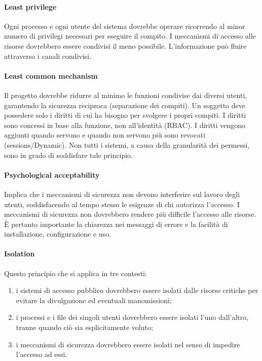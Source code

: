\paragraph{Least privilege}
Ogni processo e ogni utente del sistema dovrebbe operare ricorrendo al
minor numero di privilegi necessari per eseguire il compito.
I meccanismi di accesso alle risorse dovrebbero essere condivisi il meno possibile.
L'informazione può fluire attraverso i canali condivisi.

\paragraph{Least common mechanism}
Il progetto dovrebbe ridurre al minimo le funzioni condivise dai
diversi utenti, garantendo la sicurezza reciproca (separazione dei compiti).
Un soggetto deve possedere solo i diritti di cui ha bisogno per svolgere i propri
compiti. I diritti sono concessi in base alla funzione, non all'identità (RBAC).
I diritti vengono aggiunti quando servono e quando non servono più sono revocati
(sessions/Dynamic).
Non tutti i sistemi, a causa della granularità dei permessi, sono in grado di
soddisfare tale principio.

\paragraph{Psychological acceptability}
Implica che i meccanismi di sicurezza non devono interferire
sul lavoro degli utenti, soddisfacendo al tempo stesso le esigenze di chi
autorizza l'accesso.
I meccanismi di sicurezza non dovrebbero rendere più difficile l'accesso alle
risorse. È pertanto importante la chiarezza nei messaggi di errore e la
facilità di installazione, configurazione e uso.

\paragraph{Isolation}
Questo principio che si applica in tre contesti:
\begin{enumerate}
    \item i sistemi di accesso pubblico dovrebbero essere isolati dalle
          risorse critiche per evitare la
          divulgazione ed eventuali manomissioni;
    \item i processi e i file dei singoli utenti dovrebbero essere isolati
          l'uno dall'altro, tranne quando
          ciò sia esplicitamente voluto;
    \item i meccanismi di sicurezza dovrebbero essere isolati nel senso di
          impedire l'accesso ad essi.
\end{enumerate}

